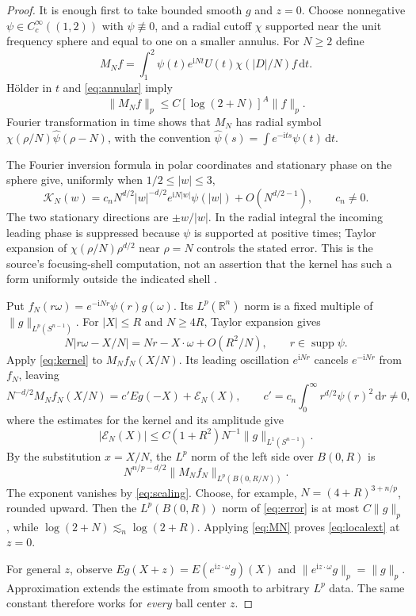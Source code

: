 \documentclass[11pt,a4paper]{article}
\numberwithin{equation}{section}
\theoremstyle{definition}
\theoremstyle{remark}
\newcommand{\R}{\mathbb R}
\newcommand{\dd}{\,\mathrm d}
\newcommand{\Sph}{S^{n-1}}
\begin{document}
\begin{proof}
It is enough first to take bounded smooth $g$ and $z=0$.
Choose nonnegative $\psi\in C_c^\infty((1,2))$ with $\psi\not\equiv0$,
and a radial cutoff $\chi$ supported near the unit frequency sphere
and equal to one on a smaller annulus. For $N\ge2$ define
\[
 M_N f=\int_1^2\psi(t)e^{\mathrm iNt}
                 U(t)\chi(|D|/N)f\dd t.
\]
H\"older in $t$ and \eqref{eq:annular} imply
\begin{equation}\label{eq:MN}
 \|M_N f\|_p\le C[\log(2+N)]^A\|f\|_p.
\end{equation}
Fourier transformation in time shows that $M_N$ has radial symbol
$\chi(\rho/N)\widehat\psi(\rho-N)$, with the convention
$\widehat\psi(s)=\int e^{-\mathrm its}\psi(t)\dd t$.

The Fourier inversion formula in polar coordinates and stationary
phase on the sphere give, uniformly when $1/2\le|w|\le3$,
\begin{equation}\label{eq:kernel}
 \mathcal K_N(w)=c_nN^{d/2}|w|^{-d/2}
       e^{\mathrm iN|w|}\psi(|w|)
       +O(N^{d/2-1}),\qquad c_n\ne0.
\end{equation}
The two stationary directions are $\pm w/|w|$. In the radial integral
the incoming leading phase is suppressed because $\psi$ is supported
at positive times; Taylor expansion of $\chi(\rho/N)\rho^{d/2}$
near $\rho=N$ controls the stated error. This is the source's
focusing-shell computation, not an assertion that the kernel has
such a form uniformly outside the indicated shell \cite{kakeya-source}.

Put $f_N(r\omega)=e^{-\mathrm iNr}\psi(r)g(\omega)$.
Its $L^p(\R^n)$ norm is a fixed multiple of $\|g\|_{L^p(\Sph)}$.
For $|X|\le R$ and $N\ge4R$, Taylor expansion gives
\begin{equation}\label{eq:distance}
 N|r\omega-X/N|=Nr-X\cdot\omega+O(R^2/N),
 \qquad r\in\operatorname{supp}\psi.
\end{equation}
Apply \eqref{eq:kernel} to $M_N f_N(X/N)$. Its leading oscillation
$e^{\mathrm iNr}$ cancels $e^{-\mathrm iNr}$ from $f_N$, leaving
\[
 N^{-d/2}M_N f_N(X/N)
 =c' E g(-X)+\mathcal E_N(X),\qquad
 c'=c_n\int_0^\infty r^{d/2}\psi(r)^2\dd r\ne0,
\]
where the estimates for the kernel and its amplitude give
\begin{equation}\label{eq:error}
 |\mathcal E_N(X)|\le C(1+R^2)N^{-1}\|g\|_{L^1(\Sph)}.
\end{equation}
By the substitution $x=X/N$, the $L^p$ norm of the left side over
$B(0,R)$ is
\[
 N^{n/p-d/2}\|M_N f_N\|_{L^p(B(0,R/N))}.
\]
The exponent vanishes by \eqref{eq:scaling}. Choose, for example,
$N=(4+R)^{3+n/p}$, rounded upward. Then the $L^p(B(0,R))$ norm of
\eqref{eq:error} is at most $C\|g\|_p$, while
$\log(2+N)\lesssim_n\log(2+R)$. Applying \eqref{eq:MN} proves
\eqref{eq:localext} at $z=0$.

For general $z$, observe
$Eg(X+z)=E(e^{\mathrm iz\cdot\omega}g)(X)$ and
$\|e^{\mathrm iz\cdot\omega}g\|_p=\|g\|_p$. Approximation extends
the estimate from smooth to arbitrary $L^p$ data. The same constant
therefore works for \emph{every} ball center $z$.
\end{proof}
\end{document}
